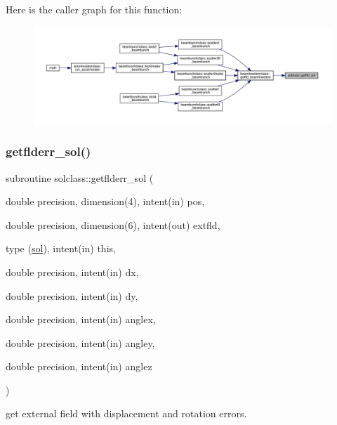 Here is the caller graph for this function\+:\nopagebreak
\begin{figure}[H]
\begin{center}
\leavevmode
\includegraphics[width=350pt]{namespacesolclass_a7a865f7ab4470f9bff328ed98aacd7c8_icgraph}
\end{center}
\end{figure}
\mbox{\label{namespacesolclass_a571ab7b6c8ce4dd9e7eaa2489b874682}} 
\subsubsection{\texorpdfstring{getflderr\_sol()}{getflderr\_sol()}}
{\footnotesize\ttfamily subroutine solclass\+::getflderr\+\_\+sol (\begin{DoxyParamCaption}\item[{double precision, dimension(4), intent(in)}]{pos,  }\item[{double precision, dimension(6), intent(out)}]{extfld,  }\item[{type (\mbox{\hyperlink{namespacesolclass_structsolclass_1_1sol}{sol}}), intent(in)}]{this,  }\item[{double precision, intent(in)}]{dx,  }\item[{double precision, intent(in)}]{dy,  }\item[{double precision, intent(in)}]{anglex,  }\item[{double precision, intent(in)}]{angley,  }\item[{double precision, intent(in)}]{anglez }\end{DoxyParamCaption})}



get external field with displacement and rotation errors. 

